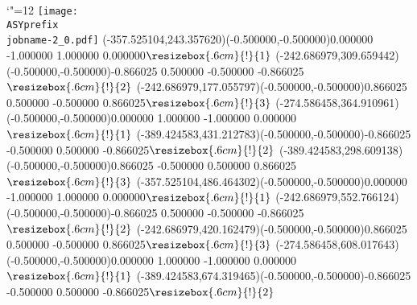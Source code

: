 \setlength{\unitlength}{1pt}
\makeatletter%
\let\ASYencoding\f@encoding%
\let\ASYfamily\f@family%
\let\ASYseries\f@series%
\let\ASYshape\f@shape%
\makeatother%
{\catcode`"=12%
\texttt{[image: \\ASYprefix\\jobname-2\_0.pdf]}%
}%
\color{ASYcolor}
\fontsize{12.000000}{14.400000}\selectfont
\usefont{\ASYencoding}{\ASYfamily}{\ASYseries}{\ASYshape}%
\ASYalignT(-357.525104,243.357620)(-0.500000,-0.500000){0.000000 -1.000000 1.000000 0.000000}{$\resizebox{.6cm}{!}{1}$}%
\color{ASYcolor}
\fontsize{12.000000}{14.400000}\selectfont
\ASYalignT(-242.686979,309.659442)(-0.500000,-0.500000){-0.866025 0.500000 -0.500000 -0.866025}{$\resizebox{.6cm}{!}{2}$}%
\color{ASYcolor}
\fontsize{12.000000}{14.400000}\selectfont
\ASYalignT(-242.686979,177.055797)(-0.500000,-0.500000){0.866025 0.500000 -0.500000 0.866025}{$\resizebox{.6cm}{!}{3}$}%
\color{ASYcolor}
\fontsize{12.000000}{14.400000}\selectfont
\ASYalignT(-274.586458,364.910961)(-0.500000,-0.500000){0.000000 1.000000 -1.000000 0.000000}{$\resizebox{.6cm}{!}{1}$}%
\color{ASYcolor}
\fontsize{12.000000}{14.400000}\selectfont
\ASYalignT(-389.424583,431.212783)(-0.500000,-0.500000){-0.866025 -0.500000 0.500000 -0.866025}{$\resizebox{.6cm}{!}{2}$}%
\color{ASYcolor}
\fontsize{12.000000}{14.400000}\selectfont
\ASYalignT(-389.424583,298.609138)(-0.500000,-0.500000){0.866025 -0.500000 0.500000 0.866025}{$\resizebox{.6cm}{!}{3}$}%
\color{ASYcolor}
\fontsize{12.000000}{14.400000}\selectfont
\ASYalignT(-357.525104,486.464302)(-0.500000,-0.500000){0.000000 -1.000000 1.000000 0.000000}{$\resizebox{.6cm}{!}{1}$}%
\color{ASYcolor}
\fontsize{12.000000}{14.400000}\selectfont
\ASYalignT(-242.686979,552.766124)(-0.500000,-0.500000){-0.866025 0.500000 -0.500000 -0.866025}{$\resizebox{.6cm}{!}{2}$}%
\color{ASYcolor}
\fontsize{12.000000}{14.400000}\selectfont
\ASYalignT(-242.686979,420.162479)(-0.500000,-0.500000){0.866025 0.500000 -0.500000 0.866025}{$\resizebox{.6cm}{!}{3}$}%
\color{ASYcolor}
\fontsize{12.000000}{14.400000}\selectfont
\ASYalignT(-274.586458,608.017643)(-0.500000,-0.500000){0.000000 1.000000 -1.000000 0.000000}{$\resizebox{.6cm}{!}{1}$}%
\color{ASYcolor}
\fontsize{12.000000}{14.400000}\selectfont
\ASYalignT(-389.424583,674.319465)(-0.500000,-0.500000){-0.866025 -0.500000 0.500000 -0.866025}{$\resizebox{.6cm}{!}{2}$}%
